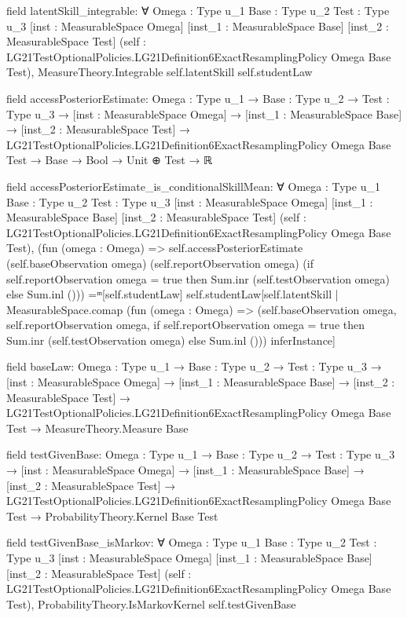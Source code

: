 \documentclass[10pt]{article}
\begin{document}
\begin{ReviewVerbatim}
field latentSkill_integrable:
∀ {Omega : Type u_1} {Base : Type u_2} {Test : Type u_3} [inst : MeasurableSpace Omega] [inst_1 : MeasurableSpace Base]
  [inst_2 : MeasurableSpace Test]
  (self : LG21TestOptionalPolicies.LG21Definition6ExactResamplingPolicy Omega Base Test),
  MeasureTheory.Integrable self.latentSkill self.studentLaw

field accessPosteriorEstimate:
{Omega : Type u_1} →
  {Base : Type u_2} →
    {Test : Type u_3} →
      [inst : MeasurableSpace Omega] →
        [inst_1 : MeasurableSpace Base] →
          [inst_2 : MeasurableSpace Test] →
            LG21TestOptionalPolicies.LG21Definition6ExactResamplingPolicy Omega Base Test →
              Base → Bool → Unit ⊕ Test → ℝ

field accessPosteriorEstimate_is_conditionalSkillMean:
∀ {Omega : Type u_1} {Base : Type u_2} {Test : Type u_3} [inst : MeasurableSpace Omega] [inst_1 : MeasurableSpace Base]
  [inst_2 : MeasurableSpace Test]
  (self : LG21TestOptionalPolicies.LG21Definition6ExactResamplingPolicy Omega Base Test),
  (fun (omega : Omega) =>
      self.accessPosteriorEstimate (self.baseObservation omega) (self.reportObservation omega)
        (if self.reportObservation omega = true then Sum.inr (self.testObservation omega)
        else Sum.inl ())) =ᵐ[self.studentLaw]
    self.studentLaw[self.latentSkill |
      MeasurableSpace.comap
        (fun (omega : Omega) =>
          (self.baseObservation omega, self.reportObservation omega,
            if self.reportObservation omega = true then Sum.inr (self.testObservation omega) else Sum.inl ()))
        inferInstance]

field baseLaw:
{Omega : Type u_1} →
  {Base : Type u_2} →
    {Test : Type u_3} →
      [inst : MeasurableSpace Omega] →
        [inst_1 : MeasurableSpace Base] →
          [inst_2 : MeasurableSpace Test] →
            LG21TestOptionalPolicies.LG21Definition6ExactResamplingPolicy Omega Base Test → MeasureTheory.Measure Base

field testGivenBase:
{Omega : Type u_1} →
  {Base : Type u_2} →
    {Test : Type u_3} →
      [inst : MeasurableSpace Omega] →
        [inst_1 : MeasurableSpace Base] →
          [inst_2 : MeasurableSpace Test] →
            LG21TestOptionalPolicies.LG21Definition6ExactResamplingPolicy Omega Base Test →
              ProbabilityTheory.Kernel Base Test

field testGivenBase_isMarkov:
∀ {Omega : Type u_1} {Base : Type u_2} {Test : Type u_3} [inst : MeasurableSpace Omega] [inst_1 : MeasurableSpace Base]
  [inst_2 : MeasurableSpace Test]
  (self : LG21TestOptionalPolicies.LG21Definition6ExactResamplingPolicy Omega Base Test),
  ProbabilityTheory.IsMarkovKernel self.testGivenBase


\end{ReviewVerbatim}
\end{document}
